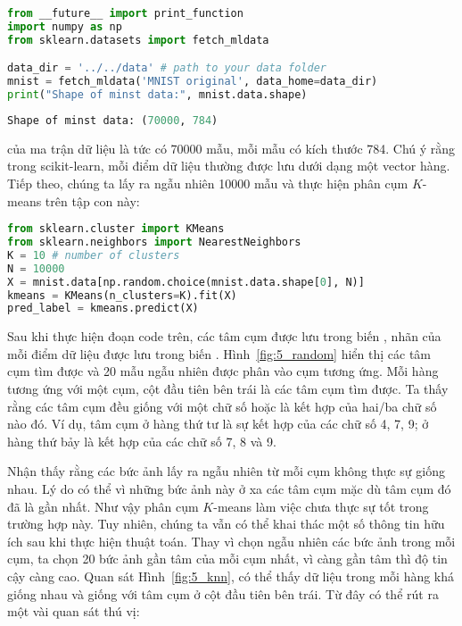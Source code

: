 \begin{lstlisting}[language=Python]
from __future__ import print_function
import numpy as np
from sklearn.datasets import fetch_mldata

data_dir = '../../data' # path to your data folder
mnist = fetch_mldata('MNIST original', data_home=data_dir)
print("Shape of minst data:", mnist.data.shape)
\end{lstlisting}
\kq
\begin{lstlisting}[language=Python]
Shape of minst data: (70000, 784)
\end{lstlisting}
 của ma trận dữ liệu  là
 tức có 70000 mẫu, mỗi mẫu có kích thước 784. Chú ý
rằng trong scikit-learn, mỗi điểm dữ liệu thường được lưu dưới dạng một vector
hàng. Tiếp theo, chúng ta lấy ra ngẫu nhiên 10000 mẫu và thực hiện phân cụm $K$-means
trên tập con này:
\begin{lstlisting}[language=Python]
from sklearn.cluster import KMeans
from sklearn.neighbors import NearestNeighbors
K = 10 # number of clusters
N = 10000
X = mnist.data[np.random.choice(mnist.data.shape[0], N)]
kmeans = KMeans(n_clusters=K).fit(X)
pred_label = kmeans.predict(X)
\end{lstlisting}





Sau khi thực hiện đoạn code trên, các tâm cụm được lưu trong biến
, nhãn của mỗi điểm dữ liệu được lưu
trong biến . Hình~\ref{fig:5_random} hiển thị các tâm
cụm tìm được và 20 mẫu ngẫu nhiên được phân vào cụm tương ứng. Mỗi hàng tương
ứng với một cụm, cột đầu tiên bên trái là các tâm cụm tìm được. Ta thấy rằng các
tâm cụm đều giống với một chữ số hoặc là kết hợp của hai/ba chữ số nào đó. Ví
dụ, tâm cụm ở hàng thứ tư là sự kết hợp của các chữ số 4, 7, 9; ở hàng thứ bảy là kết
hợp của các chữ số 7, 8 và 9.





Nhận thấy rằng các bức ảnh lấy ra ngẫu nhiên từ mỗi cụm không thực sự giống
nhau. Lý do có thể vì những bức ảnh này ở xa các tâm cụm mặc dù tâm cụm đó đã là
gần nhất. Như vậy phân cụm $K$-means làm việc chưa thực sự tốt trong trường hợp
này. Tuy nhiên, chúng ta vẫn có thể khai thác một số thông tin hữu ích sau khi
thực hiện thuật toán. Thay vì chọn ngẫu nhiên các bức ảnh trong mỗi cụm, ta chọn
20 bức ảnh gần tâm của mỗi cụm nhất, vì càng gần tâm thì độ tin cậy càng cao.
Quan sát Hình~\ref{fig:5_knn}, có thể thấy dữ liệu trong mỗi hàng khá giống nhau
và giống với tâm cụm ở cột đầu tiên bên trái. Từ đây có thể rút ra một vài quan
sát thú vị:

